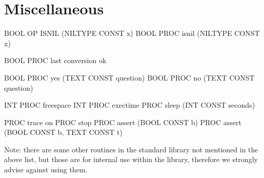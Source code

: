 \section{Miscellaneous}

\begin{elan}
BOOL OP ISNIL (NILTYPE CONST x)
BOOL PROC isnil (NILTYPE CONST x)

BOOL PROC last conversion ok

BOOL PROC yes (TEXT CONST question)
BOOL PROC no (TEXT CONST question)

INT PROC freespace
INT PROC exectime
PROC sleep (INT CONST seconds)

PROC trace on
PROC stop
PROC assert (BOOL CONST b)
PROC assert (BOOL CONST b, TEXT CONST t)
\end{elan}

\noindent
Note: there are some other routines in the standard library
not mentioned in the above list, but those are for internal
use within the library, therefore we strongly advise against using
them.

